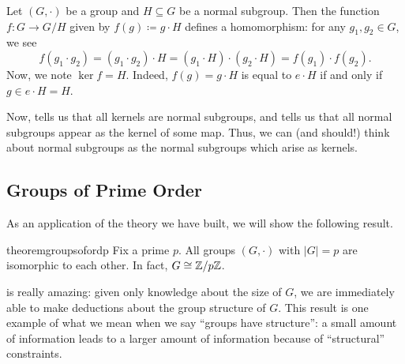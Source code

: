 \documentclass[../main.tex]{subfiles}
\begin{document}
\begin{example} \label{ex:ker-of-quotient}
    Let $(G,\cdot)$ be a group and $H\subseteq G$ be a normal subgroup. Then the function $f\colon G\to G/H$ given by $f(g)\coloneqq g\cdot H$ defines a homomorphism: for any $g_1,g_2\in G$, we see
    \[f(g_1\cdot g_2)=(g_1\cdot g_2)\cdot H=(g_1\cdot H)\cdot(g_2\cdot H)=f(g_1)\cdot f(g_2).\]
    Now, we note $\ker f=H$. Indeed, $f(g)=g\cdot H$ is equal to $e\cdot H$ if and only if $g\in e\cdot H=H$.
\end{example}
Now,  tells us that all kernels are normal subgroups, and  tells us that all normal subgroups appear as the kernel of some map. Thus, we can (and should!) think about normal subgroups as the normal subgroups which arise as kernels.

\subsection{Groups of Prime Order}
As an application of the theory we have built, we will show the following result.
\begin{restatable}{theorem}{groupsofordp} \label{thm:groups-of-ord-p}
    Fix a prime $p$. All groups $(G,\cdot)$ with $\left|G\right|=p$ are isomorphic to each other. In fact, $G\cong\mathbb Z/p\mathbb Z$.
\end{restatable}
\noindent {} is really amazing: given only knowledge about the size of $G$, we are immediately able to make deductions about the group structure of $G$. This result is one example of what we mean when we say ``groups have structure'': a small amount of information leads to a larger amount of information because of ``structural'' constraints.
\end{document}
